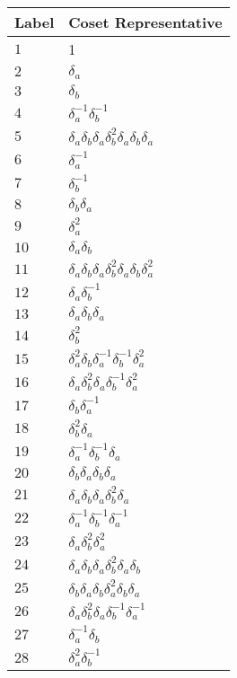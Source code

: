 \documentclass{article}
\begin{document}
\begin{center}
\begin{tabular}{ll}
\toprule
Label & Coset Representative\\
\midrule
$1$ & 1 \\
$2$ & $\delta_a^{}$ \\
$3$ & $\delta_b^{}$ \\
$4$ & $\delta_a^{-1}\delta_b^{-1}$ \\
$5$ & $\delta_a^{}\delta_b^{}\delta_a^{}\delta_b^{2}\delta_a^{}\delta_b^{}\delta_a^{}$ \\
$6$ & $\delta_a^{-1}$ \\
$7$ & $\delta_b^{-1}$ \\
$8$ & $\delta_b^{}\delta_a^{}$ \\
$9$ & $\delta_a^{2}$ \\
$10$ & $\delta_a^{}\delta_b^{}$ \\
$11$ & $\delta_a^{}\delta_b^{}\delta_a^{}\delta_b^{2}\delta_a^{}\delta_b^{}\delta_a^{2}$ \\
$12$ & $\delta_a^{}\delta_b^{-1}$ \\
$13$ & $\delta_a^{}\delta_b^{}\delta_a^{}$ \\
$14$ & $\delta_b^{2}$ \\
$15$ & $\delta_a^{2}\delta_b^{}\delta_a^{-1}\delta_b^{-1}\delta_a^{2}$ \\
$16$ & $\delta_a^{}\delta_b^{2}\delta_a^{}\delta_b^{-1}\delta_a^{2}$ \\
$17$ & $\delta_b^{}\delta_a^{-1}$ \\
$18$ & $\delta_b^{2}\delta_a^{}$ \\
$19$ & $\delta_a^{-1}\delta_b^{-1}\delta_a^{}$ \\
$20$ & $\delta_b^{}\delta_a^{}\delta_b^{}\delta_a^{}$ \\
$21$ & $\delta_a^{}\delta_b^{}\delta_a^{}\delta_b^{2}\delta_a^{}$ \\
$22$ & $\delta_a^{-1}\delta_b^{-1}\delta_a^{-1}$ \\
$23$ & $\delta_a^{}\delta_b^{2}\delta_a^{2}$ \\
$24$ & $\delta_a^{}\delta_b^{}\delta_a^{}\delta_b^{2}\delta_a^{}\delta_b^{}$ \\
$25$ & $\delta_b^{}\delta_a^{}\delta_b^{}\delta_a^{2}\delta_b^{}\delta_a^{}$ \\
$26$ & $\delta_a^{}\delta_b^{2}\delta_a^{}\delta_b^{-1}\delta_a^{-1}$ \\
$27$ & $\delta_a^{-1}\delta_b^{}$ \\
$28$ & $\delta_a^{2}\delta_b^{-1}$ \\

\end{tabular}
\end{center}
\end{document}
